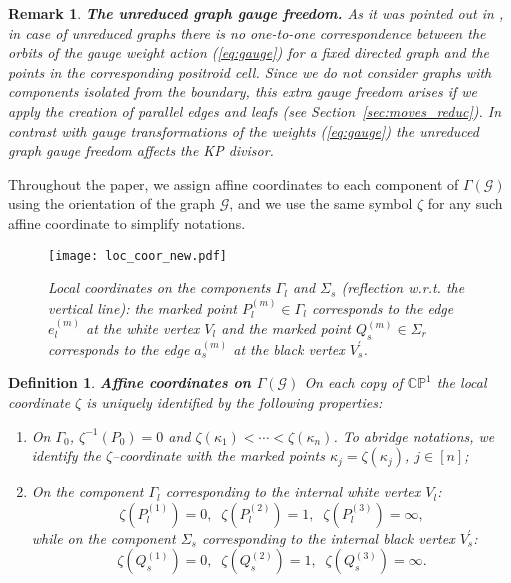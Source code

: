 \documentclass[11pt]{amsart}
\theoremstyle{plain}
\numberwithin{equation}{section}
\newtheorem{remark}{Remark}[subsection]
\newtheorem{definition}{Definition}[subsection]
\begin{document}
\begin{remark}\label{rem:gauge_freedom}\textbf{The unreduced graph gauge freedom.} As it was pointed out in \cite{Pos}, in case of unreduced graphs there is no one-to-one correspondence between the orbits of the gauge weight action (\ref{eq:gauge}) for a fixed directed graph and the points in the corresponding positroid cell. Since we do not consider graphs with components isolated from the boundary, this extra gauge freedom arises if we apply the creation of parallel edges and leafs (see Section~\ref{sec:moves_reduc}). In contrast with gauge transformations of the weights (\ref{eq:gauge}) the unreduced graph gauge freedom affects the KP divisor.
\end{remark}

Throughout the paper, we assign affine coordinates to each component of $\Gamma({\mathcal G})$ using the orientation of the graph $\mathcal G$, and we use the same symbol $\zeta$  for any such affine coordinate to simplify notations.

\begin{figure}%
  \centering
  {\texttt{[image: loc\_coor\_new.pdf]}}
	\vspace{-3.8 truecm}
  \caption{\small{\sl Local coordinates on the components $\Gamma_{l}$ and $\Sigma_{s}$ (reflection w.r.t. the vertical line): the marked point $P^{(m)}_{l}\in \Gamma_{l}$ corresponds to the edge $e^{(m)}_{l}$ at the white vertex $V_{l}$ and the marked point $Q^{(m)}_{s}\in \Sigma_{r}$ corresponds to the edge $a^{(m)}_{s}$ at the black vertex $V_{s}^{\prime}$.}}
	\label{fig:lcoord}
\end{figure}

\begin{definition}\label{def:loccoor}{\bf Affine coordinates on $\Gamma(\mathcal G)$}
On each copy of $\mathbb{ CP}^{1}$ the local coordinate $\zeta$ is uniquely identified by the following properties: 
\begin{enumerate}
\item On $\Gamma_0$, $\zeta^{-1} (P_0)=0$ and $\zeta(\kappa_1)< \cdots < \zeta(\kappa_n)$. To abridge notations, we identify the $\zeta$--coordinate with the marked points $\kappa_j=\zeta(\kappa_j)$, $j\in [n]$;
\item On the component $\Gamma_{l}$ corresponding to the internal white vertex $V_{l}$:
\[
\zeta (P^{(1)}_{l}) =0, \;\;\zeta (P^{(2)}_{l}) =1, \;\;\zeta (P^{(3)}_{l}) =\infty,
\]
while on the component $\Sigma_{s}$ corresponding to the internal black vertex $V^{\prime}_{s}$:
\[
\zeta (Q^{(1)}_{s}) =0, \;\;\zeta (Q^{(2)}_s) =1, \;\;\zeta (Q^{(3)}_{s}) =\infty.
\] 
\end{enumerate}
\end{definition}
\end{document}
